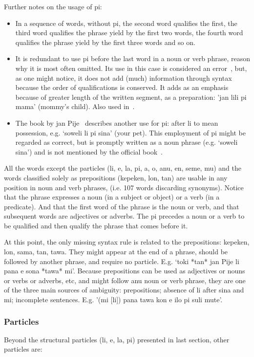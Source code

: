 \documentclass{article}
\begin{document}
\noindent Further notes on the usage of pi:
\begin{itemize}
  \item In a sequence of words, without pi, the second word qualifies
    the first, the third word qualifies the phrase yield by the first
    two words, the fourth word qualifies the phrase yield by the first
    three words and so on.
  \item It is redundant to use pi before the last word in a noun or
    verb phrase, reason why it is most often
    omitted.
    Its use in this case is considered an error~\cite{tpLang,kama},
    but, as one might notice, it does not add (much) information
    through syntax because the order of qualifications is conserved.
    It adds as an emphasis because of greater length of the written segment, as a preparation: 'jan lili pi mama' (mommy's child).
    Also used in~\cite{akesiWawa}.
  \item The book by jan Pije~\cite{kama} describes another use for pi:
    after li to mean possession, e.g. `soweli li pi sina' (your pet).
    This employment of pi might be regarded as correct, but is promptly written
    as a noun phrase (e.g. `soweli sina') and is not mentioned
    by the official book~\cite{tpLang}.
\end{itemize}

All the words except the particles (li, e, la, pi, a, o, anu, en, seme, mu)
and the words classified solely as
prepositions (kepeken, lon, tan)
are usable in any position in noun and verb phrases,
(i.e. 107 words discarding synonyms).
Notice that the phrase expresses a noun (in a subject or
object) or a verb (in a predicate).
And that the first word of the phrase is the noun or verb,
and that subsequent words are adjectives or adverbs.
The pi precedes a noun or a verb to be qualified and then qualify
the phrase that comes before it.

At this point, the only missing syntax rule is related to
the prepositions: kepeken, lon, sama, tan, tawa.
They might appear at the end of a phrase,
should be followed by another phrase,
and require no particle. E.g.
`toki *tan* jan Pije li pana e sona *tawa* mi'.
Because prepositions can be used as adjectives
or nouns or verbs or adverbs, etc, and might follow
anu noun or verb phrase,
they are one of the three main sources of ambiguity:
prepositions; absence of li after sina and mi; incomplete sentences.
E.g. '(mi [li]) pana tawa kon e ilo pi suli mute'.

\subsubsection{Particles}\label{sec:par}
Beyond the structural particles (li, e, la, pi) presented
in last section, other particles are:
\end{document}
